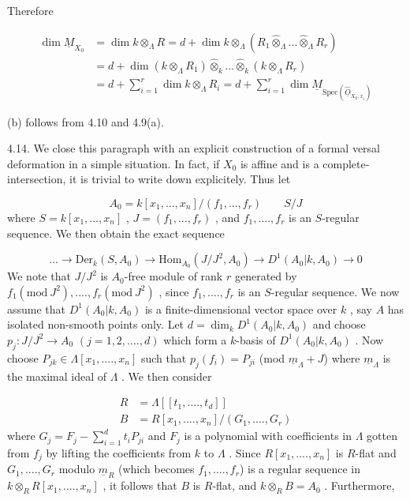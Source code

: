 Therefore

\begin{equation*}
\begin{aligned}
\dim \underline{M}_{X_0} &= \dim k \otimes_\Lambda R = d + \dim k \otimes_\Lambda (R_1 \widehat{\otimes}_\Lambda ... \widehat{\otimes}_\Lambda R_r) \\
&= d + \dim(k \otimes_\Lambda R_1) \widehat{\otimes}_k ... \widehat{\otimes}_k (k \otimes_\Lambda R_r) \\
&= d + \sum_{i=1}^{r} \dim k \otimes_\Lambda R_i = d + \sum_{i=1}^{r} \dim \underline{M}_{\mathrm{Spec}(\widehat{\underline{O}}_{X_0,x_i})}
\end{aligned}
\end{equation*}


(b)  follows from 4.10 and 4.9(a).

4.14.    We close this paragraph with an explicit construction of a formal versal deformation in a simple situation. In fact, if  $X_0$  is affine and is a complete-intersection, it is trivial to write down explicitely. Thus let

\begin{equation*}
A_0 = k[x_1,...,x_n]/(f_1,...,f_r) \qquad S/J
\end{equation*}
where  $S = k[x_1,...,x_n]$  ,  $J = (f_1,...,f_r)$  , and  $f_1,....,f_r$  is an $S$-regular sequence. We then obtain the exact sequence

\begin{equation*}
... \to \mathrm{Der}_k(S, A_0) \to \mathrm{Hom}_{A_0}(J/J^2, A_0) \to D^1(A_0|k, A_0) \to 0
\end{equation*}
We note that  $J/J^2$  is  $A_0$-free module of rank  $r$  generated by $f_1(\mathrm{mod}\ J^2),....,f_r(\mathrm{mod}\ J^2)$  , since  $f_1,....,f_r$  is an $S$-regular sequence. We now assume that  $D^1(A_0|k, A_0)$  is a finite-dimensional vector space over  $k$  , say  $A$ has isolated non-smooth points only. Let  $d = \dim_k D^1(A_0|k, A_0)$  and choose $p_j : J/J^2 \to A_0$   $(j = 1, 2,....,d)$  which form a $k$-basis of  $D^1(A_0|k, A_0)$  . Now choose  $P_{jk} \in \Lambda[x_1,....,x_n]$  such that  $p_j(f_i) = P_{ji}$  (mod $\underline{m}_\Lambda + J$)  where  $\underline{m}_\Lambda$  is the maximal ideal of  $\Lambda$  . We then consider

\begin{equation*}
\begin{aligned}
R &= \Lambda[[t_1,....,t_d]] \\
B &= R[x_1,....,x_n]/(G_1,....,G_r)
\end{aligned}
\end{equation*}
where  $G_j = F_j - \sum_{i=1}^{d} t_i P_{ji}$  and  $F_j$  is a polynomial with coefficients in  $\Lambda$ gotten from  $f_j$  by lifting the coefficients from  $k$  to  $\Lambda$  . Since $R[x_1,....,x_n]$  is $R$-flat and  $G_1,....,G_r$  modulo  $\underline{m}_R$  (which becomes  $f_1,....,f_r$) is a regular sequence in  $k \otimes_R R[x_1,....,x_n]$  , it follows that  $B$  is $R$-flat, and $k \otimes_R B = A_0$  . Furthermore,

